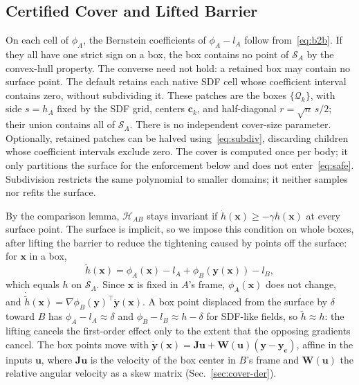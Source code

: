 \documentclass[journal]{IEEEtran}
\theoremstyle{definition}
\begin{document}
\subsection{Certified Cover and Lifted Barrier}
On each cell of $\phi_A$, the Bernstein coefficients of $\phi_A-l_A$ follow from~\eqref{eq:b2b}. If
they all have one strict sign on a box, the box contains no point of $\mathcal S_A$ by the
convex-hull property. The converse need not hold: a retained box may contain no surface point.
The default retains each native SDF cell whose coefficient interval contains zero, without
subdividing it. These patches are the boxes $\{\mathcal Q_k\}$, with side $s=h_A$ fixed by the SDF
grid, centers $\mathbf c_k$, and half-diagonal $r=\sqrt n\,s/2$; their union contains all of
$\mathcal S_A$. There is no independent cover-size parameter. Optionally, retained patches can be
halved using~\eqref{eq:subdiv}, discarding children whose coefficient intervals exclude zero.
The cover is computed once per body; it only partitions
the surface for the enforcement below and does not enter~\eqref{eq:safe}. Subdivision restricts the
same polynomial to smaller domains; it neither samples nor refits the surface.

By the comparison lemma, $\mathcal H_{AB}$ stays invariant if $\dot h(\mathbf x)\ge-\gamma h(\mathbf x)$
at every surface point. The surface is implicit, so we impose this condition on whole boxes, after
lifting the barrier to reduce the tightening caused by points off the surface: for $\mathbf x$ in a
box,
\begin{equation}\label{eq:lift}
\tilde h(\mathbf x)=\phi_A(\mathbf x)-l_A+\phi_B(\mathbf y(\mathbf x))-l_B ,
\end{equation}
which equals $h$ on $\mathcal S_A$. Since $\mathbf x$ is fixed in $A$'s frame, $\phi_A(\mathbf x)$ does
not change, and $\dot{\tilde h}(\mathbf x)=\nabla\phi_B(\mathbf y)^\top\dot{\mathbf y}(\mathbf x)$. A
box point displaced from the surface by $\delta$ toward $B$ has $\phi_A-l_A\approx\delta$ and
$\phi_B-l_B\approx h-\delta$ for SDF-like fields, so $\tilde h\approx h$: the lifting cancels the
first-order effect only to the extent that the opposing gradients cancel. The box points move with
$\dot{\mathbf y}(\mathbf x)=\mathbf J\mathbf u+\mathbf W(\mathbf u)(\mathbf y-\mathbf y_{\mathbf c})$,
affine in the inputs $\mathbf u$, where $\mathbf J\mathbf u$ is the velocity of the box center in
$B$'s frame and $\mathbf W(\mathbf u)$ the relative angular velocity as a skew matrix
(Sec.~\ref{sec:cover-der}).
\end{document}
